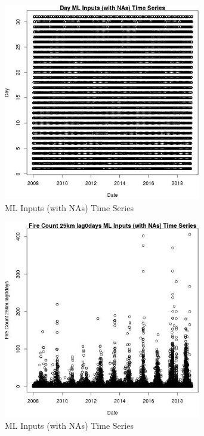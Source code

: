 \begin{figure} 
\centering  
\includegraphics[width=0.77\textwidth]{Code_Outputs/Report_ML_input_PM25_Step4_part_f_de_duplicated_aveswNAs_DayvDate.jpg} 
\caption{\label{fig:Report_ML_input_PM25_Step4_part_f_de_duplicated_aveswNAsDayvDate}ML Inputs (with NAs) Time Series} 
\end{figure} 
 

\begin{figure} 
\centering  
\includegraphics[width=0.77\textwidth]{Code_Outputs/Report_ML_input_PM25_Step4_part_f_de_duplicated_aveswNAs_Fire_Count_25km_lag0daysvDate.jpg} 
\caption{\label{fig:Report_ML_input_PM25_Step4_part_f_de_duplicated_aveswNAsFire_Count_25km_lag0daysvDate}ML Inputs (with NAs) Time Series} 
\end{figure} 
 

